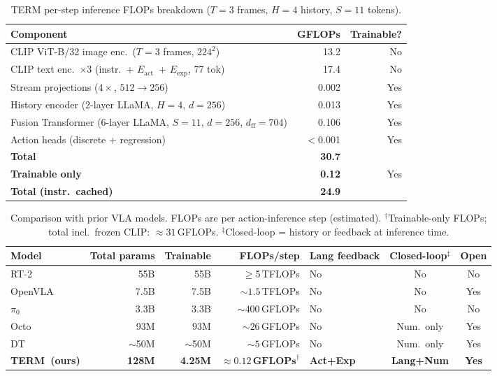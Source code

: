\documentclass{article}
\newcommand{\modelname}{\textsc{TERM}\xspace}
\newcommand{\Lact}{$E_{\mathrm{act}}$\xspace}
\newcommand{\Lexp}{$E_{\mathrm{exp}}$\xspace}
\begin{document}
\begin{table}[h]
\centering
\caption{TERM per-step inference FLOPs breakdown ($T{=}3$ frames, $H{=}4$ history, $S{=}11$ tokens).}
\label{tab:flops}
\small
\begin{tabular}{lrr}
\toprule
\textbf{Component} & \textbf{GFLOPs} & \textbf{Trainable?} \\
\midrule
CLIP ViT-B/32 image enc.\ ($T{=}3$ frames, $224^2$) & 13.2  & No  \\
CLIP text enc.\ $\times3$ (instr.\ + \Lact\ + \Lexp, 77 tok) & 17.4  & No  \\
\midrule
Stream projections ($4\times$, $512\!\to\!256$)  & 0.002 & Yes \\
History encoder (2-layer LLaMA, $H{=}4$, $d{=}256$) & 0.013 & Yes \\
Fusion Transformer (6-layer LLaMA, $S{=}11$, $d{=}256$, $d_{\mathrm{ff}}{=}704$) & 0.106 & Yes \\
Action heads (discrete + regression)             & $<$0.001 & Yes \\
\midrule
\textbf{Total}            & \textbf{30.7}  &     \\
\textbf{Trainable only}   & \textbf{0.12}  & Yes \\
\textbf{Total (instr.\ cached)}  & \textbf{24.9} & \\
\bottomrule
\end{tabular}
\end{table}

\begin{table}[h]
\centering
\caption{Comparison with prior VLA models.
  FLOPs are per action-inference step (estimated).
  $^\dagger$Trainable-only FLOPs; total incl.\ frozen CLIP: ${\approx}31$\,GFLOPs.
  $^\ddagger$Closed-loop = history or feedback at inference time.}
\label{tab:comparison}
\small
\setlength{\tabcolsep}{4pt}
\begin{tabular}{lrrrlcc}
\toprule
\textbf{Model} & \textbf{Total params} & \textbf{Trainable} & \textbf{FLOPs/step}
               & \textbf{Lang feedback} & \textbf{Closed-loop$^\ddagger$} & \textbf{Open} \\
\midrule
RT-2~\citep{brohan2023rt2}     & 55B  & 55B   & $\ge$5\,TFLOPs   & No  & No          & No  \\
OpenVLA~\citep{kim2024openvla} & 7.5B & 7.5B  & ${\sim}1.5$\,TFLOPs & No & No        & Yes \\
$\pi_0$~\citep{black2024pi0}   & 3.3B & 3.3B  & ${\sim}400$\,GFLOPs & No & No        & No  \\
Octo~\citep{octo2024}          & 93M  & 93M   & ${\sim}26$\,GFLOPs  & No & Num.\ only & Yes \\
DT~\citep{chen2021decision}    & ${\sim}$50M & ${\sim}$50M & ${\sim}5$\,GFLOPs & No & Num.\ only & Yes \\
\midrule
\textbf{\modelname\ (ours)}    & \textbf{128M} & \textbf{4.25M}
                               & $\mathbf{{\approx}0.12\,\text{GFLOPs}}^\dagger$
                               & \textbf{Act+Exp} & \textbf{Lang+Num} & \textbf{Yes} \\
\bottomrule
\end{tabular}
\end{table}
\end{document}
